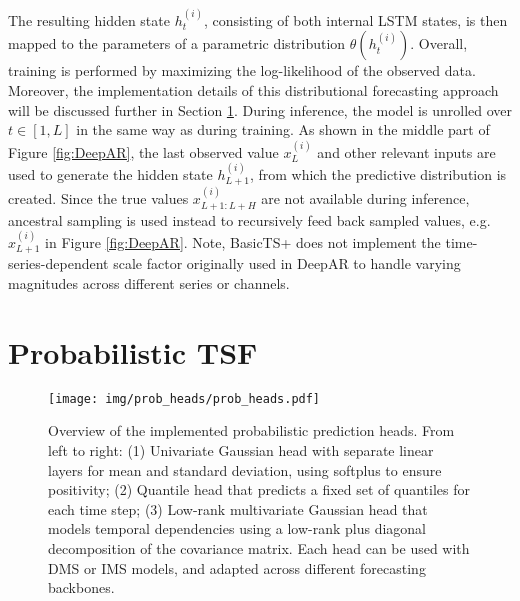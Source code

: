 \documentclass[a4paper,oneside,bibliography=totoc]{scrbook}
\begin{document}
The resulting hidden state ${h_{t}^{(i)}}$, consisting of both internal LSTM states, is then mapped to the parameters of a parametric distribution $\theta(h_{t}^{(i)})$. 
Overall, training is performed by maximizing the log-likelihood of the observed data. 
Moreover, the implementation details of this distributional forecasting approach 
will be discussed further in Section \ref{sec:prob_heads}.
During inference, the model is unrolled over $t \in [1, L]$ in the same way as during training. 
As shown in the middle part of Figure \ref{fig:DeepAR}, the last observed value $x_{L}^{(i)}$ and other relevant inputs are used to generate the hidden state ${h_{L+1}^{(i)}}$, from which the predictive distribution is created. 
Since the true values $x_{L+1:L+H}^{(i)}$ are not available during inference, ancestral sampling is used instead to recursively feed back sampled values, e.g. $\hat{x}_{L+1}^{(i)}$ in Figure \ref{fig:DeepAR}. %
Note, BasicTS+ does not implement the time-series-dependent scale factor originally used in DeepAR to handle varying magnitudes across different series or channels.



\section{Probabilistic TSF}
\label{sec:prob_heads}

\begin{figure}
    \centering
    \texttt{[image: img/prob\_heads/prob\_heads.pdf]}
    \caption{Overview of the implemented probabilistic prediction heads. From left to right: (1) Univariate Gaussian head with separate linear layers for mean and standard deviation, using softplus to ensure positivity; (2) Quantile head that predicts a fixed set of quantiles for each time step; (3) Low-rank multivariate Gaussian head that models temporal dependencies using a low-rank plus diagonal decomposition of the covariance matrix. Each head can be used with DMS or IMS models, and adapted across different forecasting backbones.}
    \label{fig:prob_heads}
\end{figure}
\end{document}

